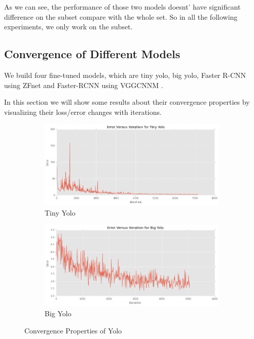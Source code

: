 As we can see, the performance of those two models doesnt' have 
significant difference on the subset compare with the whole set. 
So in all the following experiments, we only work on the subset.

\subsection{Convergence of Different Models}
We build four fine-tuned models, which are
tiny yolo, big yolo, Faster R-CNN using ZFnet and 
Faster-RCNN using VGG\textunderscore CNN\textunderscore M \cite{chatfield2014return}.

In this section we will show some results about 
their convergence properties by visualizing their loss/error 
changes with iterations.

\begin{figure}[H]
\centering
\begin{subfigure}[t]{.49\textwidth}
    \centering
    \includegraphics[width=1.0\linewidth]{img/yolo_tiny_cov.png}
    \caption{Tiny Yolo}
\end{subfigure}
\begin{subfigure}[t]{.49\textwidth}
    \centering
    \includegraphics[width=1.0\linewidth]{img/yolo_big_cov.png}
    \caption{Big Yolo}
\end{subfigure}
\caption{Convergence Properties of Yolo}
\end{figure}

